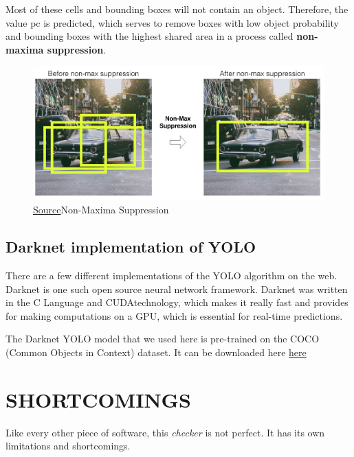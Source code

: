 \documentclass[a4paper]{article}
\begin{document}
Most of these cells and bounding boxes will not contain an object. Therefore, the value pc is predicted, which serves to remove boxes with low object probability and bounding boxes with the highest shared area in a process called \textbf{non-maxima suppression}.

\begin{figure}[h!]
    \centering
    \includegraphics[width=0.9\linewidth]{Pictures/yoloWorks3.png}
    \caption{\textcolor{green}{\href{https://appsilon.com/object-detection-yolo-algorithm/}{Source}}Non-Maxima Suppression}
    \label{fig:NMS}
\end{figure}
\pagebreak
\subsection{Darknet implementation of YOLO}
There are a few different implementations of the YOLO algorithm on the web. Darknet is one such open source neural network framework. Darknet was written in the C Language and CUDAtechnology, which makes it really fast and provides for making computations on a GPU, which is essential for real-time predictions.

The Darknet YOLO model that we used here is pre-trained on the COCO (Common Objects in Context) dataset. It can be downloaded here \textcolor{green}{\href{https://pjreddie.com/darknet/yolo/}{here}}
\newpage

\section{SHORTCOMINGS}

Like every other piece of software, this \textit{checker} is not perfect. It has its own limitations and shortcomings.
\end{document}
